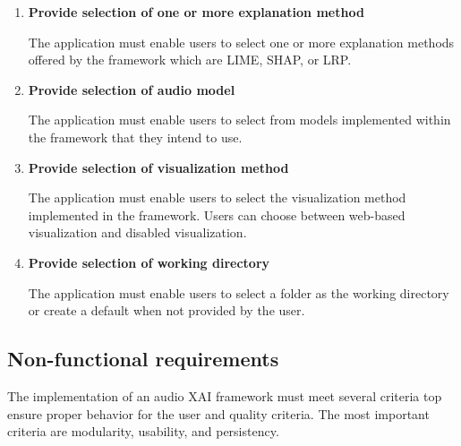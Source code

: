 \documentclass[
    bindingoffset=5mm,  %
    footnoteindent=3mm, %
    hyphenation=true    %
]{src/wut-thesis}
\begin{document}
    \begin{enumerate}

    \item \textbf{Provide selection of one or more explanation method}

        The application must enable users to select one or more explanation methods offered by the framework which are LIME, SHAP, or LRP.

    \item \textbf{Provide selection of audio model}

            The application must enable users to select from models implemented within the framework that they
        intend to use. 

    \item \textbf{Provide selection of visualization method}

        The application must enable users to select the visualization method implemented in the framework.
    Users can choose between web-based visualization and disabled visualization.

    \item \textbf{Provide selection of working directory}

    The application must enable users to select a folder as the working directory or create a default when not provided by the user.

    \end{enumerate}

\subsection{Non-functional requirements}

    The implementation of an audio XAI framework must meet several criteria
    top ensure proper behavior for the user and quality criteria.
    The most important criteria are modularity, usability, and persistency.
\end{document}
